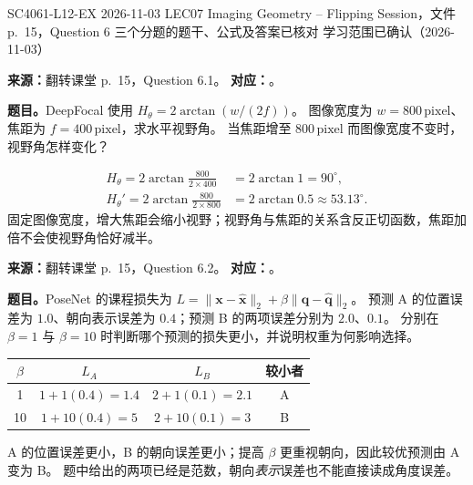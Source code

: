 

\examplemeta
  {SC4061-L12-EX}
  {2026-11-03}
  {LEC07 Imaging Geometry -- Flipping Session，文件 p.~15，Question 6}
  {三个分题的题干、公式及答案已核对}
  {学习范围已确认（2026-11-03）}

\nopagebreak[4]

\textbf{来源：}翻转课堂 p.~15，Question 6.1。
\textbf{对应：}。
\nopagebreak[4]

\textbf{题目。}DeepFocal 使用 $H_\theta=2\arctan(w/(2f))$。
图像宽度为 $w=800\,\mathrm{pixel}$、焦距为 $f=400\,\mathrm{pixel}$，求水平视野角。
当焦距增至 $800\,\mathrm{pixel}$ 而图像宽度不变时，视野角怎样变化？

\begin{checkedsolution}
\begin{align*}
  H_\theta=2\arctan\frac{800}{2\times400}
  &=2\arctan1=\boxed{90^\circ},\\
  H_\theta'=2\arctan\frac{800}{2\times800}
  &=2\arctan0.5\approx\boxed{53.13^\circ}.
\end{align*}
固定图像宽度，增大焦距会缩小视野；视野角与焦距的关系含反正切函数，焦距加倍不会使视野角恰好减半。
\end{checkedsolution}

\nopagebreak[4]

\textbf{来源：}翻转课堂 p.~15，Question 6.2。
\textbf{对应：}。
\nopagebreak[4]

\textbf{题目。}PoseNet 的课程损失为
$L=\|\bm x-\hat{\bm x}\|_2+\beta\|\bm q-\hat{\bm q}\|_2$。
预测 A 的位置误差为 $1.0$、朝向表示误差为 $0.4$；预测 B 的两项误差分别为 $2.0$、$0.1$。
分别在 $\beta=1$ 与 $\beta=10$ 时判断哪个预测的损失更小，并说明权重为何影响选择。

\begin{checkedsolution}
\begin{center}
\begin{tabular}{@{}cccc@{}}
  \toprule
  $\beta$ & $L_A$ & $L_B$ & 较小者 \\
  \midrule
  1 & $1+1(0.4)=1.4$ & $2+1(0.1)=2.1$ & A \\
  10 & $1+10(0.4)=5$ & $2+10(0.1)=3$ & B \\
  \bottomrule
\end{tabular}
\end{center}
A 的位置误差更小，B 的朝向误差更小；提高 $\beta$ 更重视朝向，因此较优预测由 A 变为 B。
题中给出的两项已经是范数，朝向\emph{表示}误差也不能直接读成角度误差。
\end{checkedsolution}

